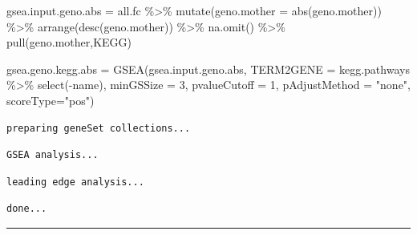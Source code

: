 \documentclass[
  24px,
  letterpaper,
  DIV=11,
  numbers=noendperiod]{scrartcl}
\newenvironment{Shaded}{\begin{snugshade}}{\end{snugshade}}
\newcommand{\AttributeTok}[1]{\textcolor[rgb]{0.40,0.45,0.13}{#1}}
\newcommand{\DecValTok}[1]{\textcolor[rgb]{0.68,0.00,0.00}{#1}}
\newcommand{\FunctionTok}[1]{\textcolor[rgb]{0.28,0.35,0.67}{#1}}
\newcommand{\NormalTok}[1]{\textcolor[rgb]{0.00,0.23,0.31}{#1}}
\newcommand{\OtherTok}[1]{\textcolor[rgb]{0.00,0.23,0.31}{#1}}
\newcommand{\SpecialCharTok}[1]{\textcolor[rgb]{0.37,0.37,0.37}{#1}}
\newcommand{\StringTok}[1]{\textcolor[rgb]{0.13,0.47,0.30}{#1}}
\begin{document}
\begin{Shaded}
\begin{Highlighting}[]
\NormalTok{gsea.input.geno.abs }\OtherTok{=}\NormalTok{ all.fc }\SpecialCharTok{\%\textgreater{}\%}
  \FunctionTok{mutate}\NormalTok{(}\AttributeTok{geno.mother =} \FunctionTok{abs}\NormalTok{(geno.mother)) }\SpecialCharTok{\%\textgreater{}\%} 
  \FunctionTok{arrange}\NormalTok{(}\FunctionTok{desc}\NormalTok{(geno.mother)) }\SpecialCharTok{\%\textgreater{}\%} 
  \FunctionTok{na.omit}\NormalTok{() }\SpecialCharTok{\%\textgreater{}\%}
  \FunctionTok{pull}\NormalTok{(geno.mother,KEGG) }

\NormalTok{gsea.geno.kegg.abs }\OtherTok{=} \FunctionTok{GSEA}\NormalTok{(gsea.input.geno.abs, }
                           \AttributeTok{TERM2GENE =}\NormalTok{ kegg.pathways }\SpecialCharTok{\%\textgreater{}\%} \FunctionTok{select}\NormalTok{(}\SpecialCharTok{{-}}\NormalTok{name),}
                           \AttributeTok{minGSSize =} \DecValTok{3}\NormalTok{, }\AttributeTok{pvalueCutoff =} \DecValTok{1}\NormalTok{,}
                           \AttributeTok{pAdjustMethod =} \StringTok{"none"}\NormalTok{, }
                           \AttributeTok{scoreType=}\StringTok{"pos"}\NormalTok{)}
\end{Highlighting}
\end{Shaded}

\begin{verbatim}
preparing geneSet collections...
\end{verbatim}

\begin{verbatim}
GSEA analysis...
\end{verbatim}

\begin{verbatim}
leading edge analysis...
\end{verbatim}

\begin{verbatim}
done...
\end{verbatim}

\begin{center}\rule{0.5\linewidth}{0.5pt}\end{center}

\begin{Shaded}
\end{Shaded}
\end{document}
